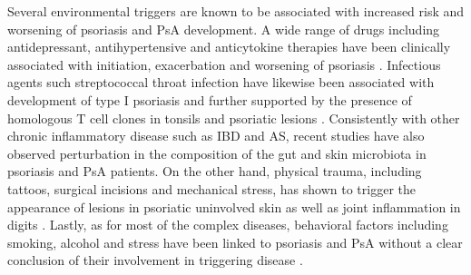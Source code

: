 Several environmental triggers are known to be associated with increased risk and worsening of psoriasis and PsA development. A wide range of drugs including antidepressant, antihypertensive and anticytokine therapies have been clinically associated with initiation, exacerbation and worsening of psoriasis \parencite{Kim2010}. Infectious agents such streptococcal throat infection have likewise been associated with development of type I psoriasis \parencite{Gudjonsson2003,Valdimarsson2009} and further supported by the presence of homologous T cell clones in tonsils and psoriatic lesions \parencite{Diluvio2006}. Consistently with other chronic inflammatory disease such as IBD and AS, recent studies have also observed perturbation in the composition of the gut and skin microbiota in psoriasis and PsA patients. On the other hand, physical trauma, including tattoos, surgical incisions and mechanical stress, has shown to trigger the appearance of lesions in psoriatic uninvolved skin as well as joint inflammation in digits \parencite {Weiss2002,Nestle2009}. Lastly, as for most of the complex diseases, behavioral factors including smoking, alcohol and stress have been linked to psoriasis and PsA without a clear conclusion of their involvement in triggering disease \parencite{Meglio2014}.

